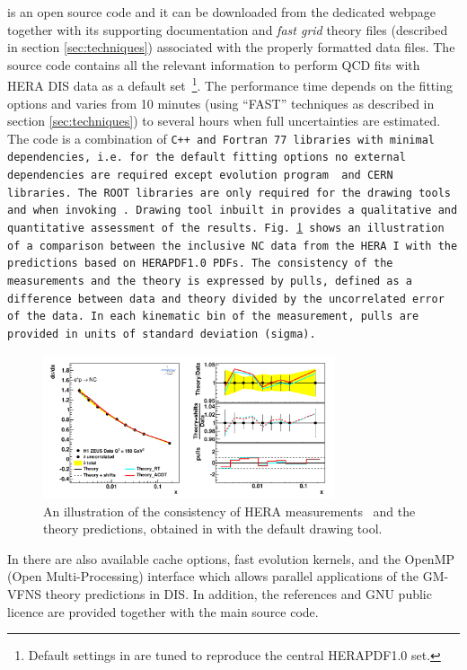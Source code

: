 
\fitter is an open source code and it can be downloaded from the dedicated webpage \cite{herafitter:page}
together with its supporting documentation and 
\emph{fast grid} theory files (described in section \ref{sec:techniques}) associated with the properly formatted data files.
The source code contains all the relevant information to perform QCD fits with HERA DIS data as a default 
set~\footnote{Default settings in \fitter are tuned to reproduce the central HERAPDF1.0 set.}. 
The performance time depends on the fitting options and varies from 10 minutes 
(using ``FAST'' techniques as described in section \ref{sec:techniques}) to several hours when 
full uncertainties are estimated. The \fitter code is a combination of \tt C++ \rm and \tt Fortran 77\rm \ libraries with minimal 
dependencies, i.e. for the default fitting options no external dependencies are required except \qcdnum evolution program \cite{qcdnum} and CERN libraries. 
The \tt ROOT \rm  libraries are only required for the drawing tools and when invoking \applgrid.  
Drawing tool inbuilt in \fitter provides a qualitative and quantitative assessment of the results.
Fig.~\ref{fig:data} shows an illustration of a comparison between the inclusive NC data from the HERA I
with the predictions based on 
HERAPDF1.0 PDFs.
The consistency of the measurements and the theory is expressed by pulls, defined as a difference between data and theory divided by the uncorrelated error of the data. 
In each kinematic bin of the measurement, pulls are provided in units of standard deviation (sigma).  
\begin{figure}[!ht]
   \centering
   \includegraphics[width=8.6cm]{datatheory.pdf}
   \caption{An illustration of the consistency of HERA measurements~\cite{h1zeus:2009wt} and the theory predictions, 
       obtained in \fitter with the default drawing tool.} 
 \label{fig:data}
\end{figure}

%
In \fitter there are also available cache options, fast evolution kernels, and the OpenMP (Open Multi-Processing) 
interface which allows parallel applications of the GM-VFNS theory predictions in DIS. 
In addition, the \fitter references and GNU public licence are provided 
together with the main source code. 


